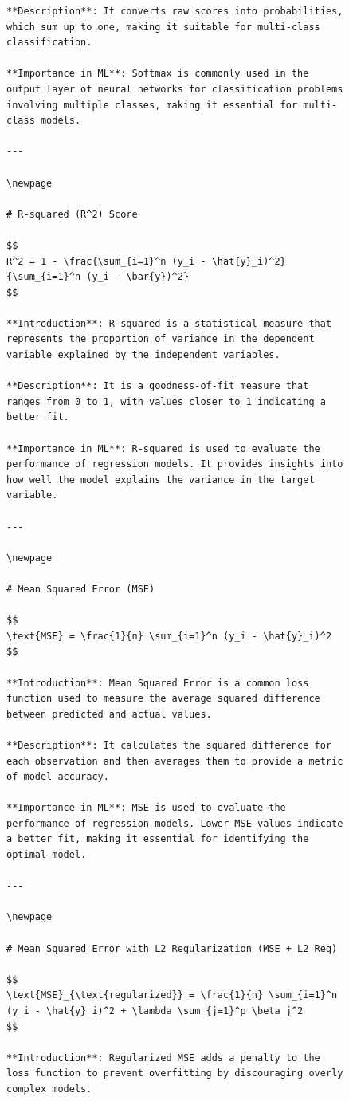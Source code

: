 \documentclass[
  12 pt,
  a4paper,
]{book}
\numberwithin{equation}{section}
\theoremstyle{plain}      %
\theoremstyle{definition} %
\theoremstyle{remark}     %
\theoremstyle{note}         %
\begin{document}
\begin{figure}
\begin{verbatim}
**Description**: It converts raw scores into probabilities, which sum up to one, making it suitable for multi-class classification.

**Importance in ML**: Softmax is commonly used in the output layer of neural networks for classification problems involving multiple classes, making it essential for multi-class models.

---

\newpage

# R-squared (R^2) Score

$$
R^2 = 1 - \frac{\sum_{i=1}^n (y_i - \hat{y}_i)^2}{\sum_{i=1}^n (y_i - \bar{y})^2}
$$

**Introduction**: R-squared is a statistical measure that represents the proportion of variance in the dependent variable explained by the independent variables.

**Description**: It is a goodness-of-fit measure that ranges from 0 to 1, with values closer to 1 indicating a better fit.

**Importance in ML**: R-squared is used to evaluate the performance of regression models. It provides insights into how well the model explains the variance in the target variable.

---

\newpage

# Mean Squared Error (MSE)

$$
\text{MSE} = \frac{1}{n} \sum_{i=1}^n (y_i - \hat{y}_i)^2
$$

**Introduction**: Mean Squared Error is a common loss function used to measure the average squared difference between predicted and actual values.

**Description**: It calculates the squared difference for each observation and then averages them to provide a metric of model accuracy.

**Importance in ML**: MSE is used to evaluate the performance of regression models. Lower MSE values indicate a better fit, making it essential for identifying the optimal model.

---

\newpage

# Mean Squared Error with L2 Regularization (MSE + L2 Reg)

$$
\text{MSE}_{\text{regularized}} = \frac{1}{n} \sum_{i=1}^n (y_i - \hat{y}_i)^2 + \lambda \sum_{j=1}^p \beta_j^2
$$

**Introduction**: Regularized MSE adds a penalty to the loss function to prevent overfitting by discouraging overly complex models.


\end{verbatim}
\end{figure}
\end{document}
